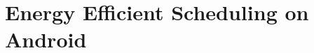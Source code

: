 \documentclass[conference]{IEEEtran}
\begin{document}





%

\section{Energy Efficient Scheduling on Android} \label{sec:energyschedule}


\end{document}
